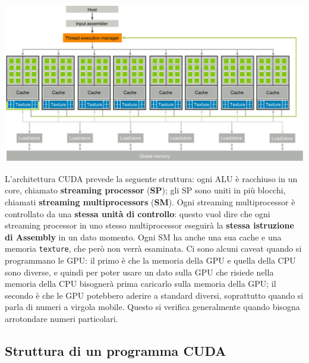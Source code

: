 \begin{center}
    \includegraphics[scale = 0.27]{imgs/001.png}
\end{center}

L'architettura CUDA prevede la seguente struttura: ogni ALU è racchiuso in un core, chiamato \textbf{streaming processor} (\textbf{SP}); gli SP sono uniti in più blocchi, chiamati \textbf{streaming multiprocessors} (\textbf{SM}). Ogni streaming multiprocessor è controllato da una \textbf{stessa unità di controllo}: questo vuol dire che ogni streaming processor in uno stesso multiprocessor eseguirà la \textbf{stessa istruzione di Assembly} in un dato momento. Ogni SM ha anche una sua cache e una memoria \verb|texture|, che però non verrà esaminata.
\nwl
Ci sono alcuni caveat quando si programmano le GPU: il primo è che la memoria della GPU e quella della CPU sono diverse, e quindi per poter usare un dato sulla GPU che risiede nella memoria della CPU bisognerà prima caricarlo sulla memoria della GPU; il secondo è che le GPU potebbero aderire a standard diversi, soprattutto quando si parla di numeri a virgola mobile. Questo si verifica generalmente quando bisogna arrotondare numeri particolari.

\subsection{Struttura di un programma CUDA}


